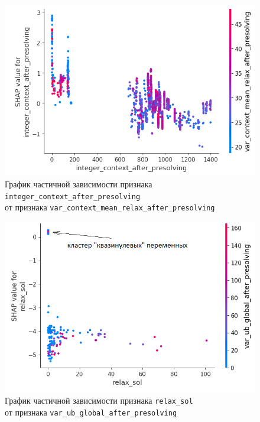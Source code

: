 \documentclass[%
	11pt,
	a4paper,
	utf8,
		]{article}
\begin{document}
\begin{figure}[h]
	\centering
	\includegraphics[scale=0.90]{figures/part_depend_integer_context.png}
	\caption{ График частичной зависимости признака \texttt{integer\_context\_after\_presolving} \\от признака \texttt{var\_context\_mean\_relax\_after\_presolving} }\label{fig:part_depend_integer_context}
\end{figure}

\begin{figure}[h]
	\centering
	\includegraphics[scale=0.90]{figures/part_depend_relax_sol.png}
	\caption{ График частичной зависимости признака \texttt{relax\_sol} \\от признака \texttt{var\_ub\_global\_after\_presolving} }\label{fig:part_depend_relax_sol}
\end{figure}
\end{document}
